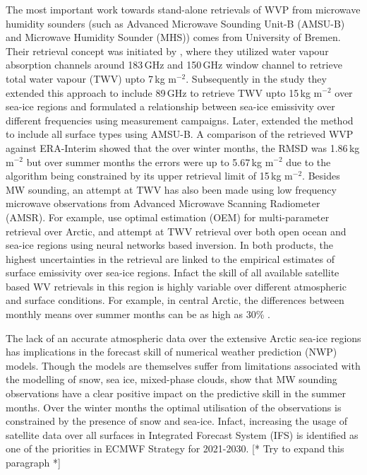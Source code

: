\documentclass[12pt,oneside,a4paper]{article}
\newcommand\intodo[1]{{\color{red} [* #1 *]}}
\begin{document}
The most important work towards stand-alone retrievals of WVP from microwave humidity sounders (such as Advanced Microwave
Sounding Unit-B (AMSU-B) and Microwave Humidity Sounder (MHS)) comes from
University of Bremen. Their retrieval concept was initiated by
\citet{miao:2001:atmos}, where they utilized water vapour absorption channels
around 183\,GHz and 150\,GHz window channel to retrieve total water vapour
(TWV) upto 7\,kg m$^{-2}$. Subsequently in the study  they
extended this approach to include 89\,GHz to retrieve TWV upto 15\,kg m$^{-2}$
over sea-ice regions and formulated a relationship between sea-ice emissivity
over different frequencies using measurement campaigns. Later,
\cite{scarlat:2018:retri} extended the method to include all surface types
using AMSU-B. A comparison of the retrieved WVP against ERA-Interim showed that
the over winter months, the RMSD was 1.86\,kg m$^{-2}$ but over summer months
the errors were up to 5.67\,kg m$^{-2}$ due to the algorithm being constrained
by its upper retrieval limit of 15\,kg m$^{-2}$. Besides MW sounding, an
attempt at TWV has also been made using low frequency microwave observations
from Advanced Microwave Scanning Radiometer (AMSR). For example,
\citet{scarlat:2017:exper} use optimal estimation (OEM) for multi-parameter
retrieval over Arctic, and \citet{zabolotskikh:2020:anadv} attempt at TWV
retrieval over both open ocean and sea-ice regions using neural networks based
inversion. In both products, the highest uncertainties in the retrieval are
linked to the empirical estimates of surface emissivity over sea-ice regions.
Infact the skill of all available satellite based WV retrievals in this region
is highly variable over different atmospheric and surface conditions. For
example, in central Arctic, the differences between monthly means over summer
months can be as high as 30\% \citep{crewell:2021:asyst}.

The lack of an accurate atmospheric data over the extensive Arctic sea-ice
regions has implications in the forecast skill of numerical weather prediction
(NWP) models. Though the models are themselves suffer from limitations
associated with the modelling of snow, sea ice, mixed-phase clouds,
\citet{lawrence:2019:usean} show that MW sounding observations have a clear
positive impact on the predictive skill in the summer months. Over the winter
months the optimal utilisation of the observations is constrained by the
presence of snow and sea-ice. Infact, increasing the usage of satellite data
over all surfaces in Integrated Forecast System (IFS) is identified as one of
the priorities in ECMWF Strategy for 2021-2030. 
\intodo{Try to expand this paragraph}
\end{document}
